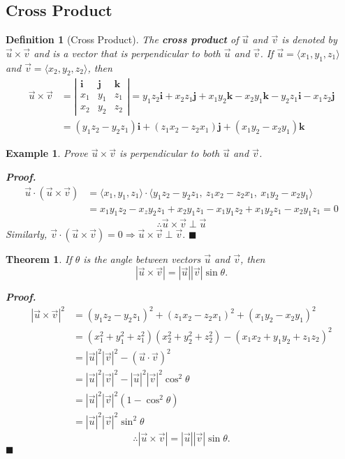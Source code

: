 \documentclass[12pt,a4paper]{article}
\newtheorem{thm}{Theorem}[subsection]
\newtheorem{df}{Definition}[subsection]
\newtheorem{eg}{Example}[subsection]
\newenvironment*{prf}{\par\indent\textbf{\textit{Proof. }}}{\hfill $\blacksquare$\par}
\def\vecv{\vec{v}}
\def\vecu{\vec{u}}
\def\veci{\boldsymbol{\textbf{i}}}
\def\vecj{\boldsymbol{\textbf{j}}}
\def\veck{\boldsymbol{\textbf{k}}}
\begin{document}
\subsection{Cross Product}
\begin{df}[Cross Product]
	The \textbf{cross product} of $\vecu$ and $\vecv$ is denoted by $\vecu\times\vecv$ and is a vector that is perpendicular to both $\vecu$ and $\vecv$. If $\vecu=\langle x_1,y_1,z_1\rangle$ and $\vecv=\langle x_2,y_2,z_2\rangle$, then 
	\[\begin{aligned}
		\vecu\times\vecv&=\left|\begin{matrix}\veci&\vecj&\veck\\x_1&y_1&z_1\\x_2&y_2&z_2\end{matrix}\right|=y_1z_2\veci+x_2z_1\vecj+x_1y_2\veck-x_2y_1\veck-y_2z_1\veci-x_1z_2\vecj\\
		&=(y_1z_2-y_2z_1)\veci+(z_1x_2-z_2x_1)\vecj+(x_1y_2-x_2y_1)\veck
	\end{aligned}\]
\end{df}
\begin{eg}
	Prove $\vecu\times\vecv$ is perpendicular to both $\vecu$ and $\vecv$.
	\begin{prf}	
		\[\begin{aligned}
			\vecu\cdot(\vecu\times\vecv)&=\langle x_1,y_1,z_1\rangle\cdot\langle y_1z_2-y_2z_1,\ z_1x_2-z_2x_1,\ x_1y_2-x_2y_1\rangle\\
			&=x_1y_1z_2-x_zy_2z_1+x_2y_1z_1-x_1y_1z_2+x_1y_2z_1-x_2y_1z_1=0
		\end{aligned}\]
		\[\therefore \vecu\times\vecv\perp\vecu\]
		Similarly, $\vecv\cdot(\vecu\times\vecv)=0\Longrightarrow\vecu\times\vecv\perp\vecv.$
	\end{prf}
\end{eg}
\begin{thm}
	If $\theta$ is the angle between vectors $\vecu$ and $\vecv$, then \[|\vecu\times\vecv|=|\vecu||\vecv|\sin\theta.\]
	\begin{prf}
		\[\begin{aligned}
			|\vecu\times\vecv|^2&=(y_1z_2-y_2z_1)^2+(z_1x_2-z_2x_1)^2+(x_1y_2-x_2y_1)^2\\
			&=(x_1^2+y_1^2+z_1^2)(x_2^2+y_2^2+z_2^2)-(x_1x_2+y_1y_2+z_1z_2)^2\\
			&=|\vecu|^2|\vecv|^2-(\vecu\cdot\vecv)^2\\
			&=|\vecu|^2|\vecv|^2-|\vecu|^2|\vecv|^2\cos^2\theta\\
			&=|\vecu|^2|\vecv|^2(1-\cos^2\theta)\\
			&=|\vecu|^2|\vecv|^2\sin^2\theta
		\end{aligned}\]
		\[\therefore |\vecu\times\vecv|=|\vecu||\vecv|\sin\theta.\]
	\end{prf}
\end{thm}
\end{document}
